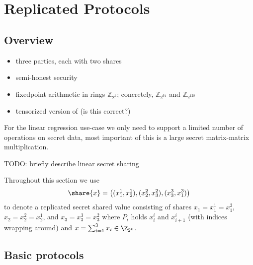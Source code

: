 \section{Replicated Protocols}


\subsection{Overview}

\begin{itemize}
    \item three parties, each with two shares
    \item semi-honest security
    \item fixedpoint arithmetic in rings $\mathbb{Z}_{2^{k}}$; concretely, $\mathbb{Z}_{2^{64}}$ and $\mathbb{Z}_{2^{128}}$
    \item tensorized version of \cite{CCS:AFLNO16} (is this correct?)
\end{itemize}

For the linear regression use-case we only need to support a limited number of
operations on secret data, most important of this is a large secret matrix-matrix
multiplication.

TODO: briefly describe linear secret sharing

Throughout this section we use 
$$
\share{x} = \big((x_1^1, x_2^1), (x_2^2, x_3^2), (x_3^3, x_1^3)\big)
$$ to denote a replicated secret shared value consisting of shares $x_1 = x_1^1 = x_1^3$, $x_2 = x_2^2 = x_2^1$, and $x_3 = x_3^3 = x_3^2$ where $P_i$ holds $x_i^i$ and $x_{i+1}^i$ (with indices wrapping around) and $x = \sum_{i=1}^3 x_i \in \Z_{2^k}$. 

\subsection{Basic protocols}









